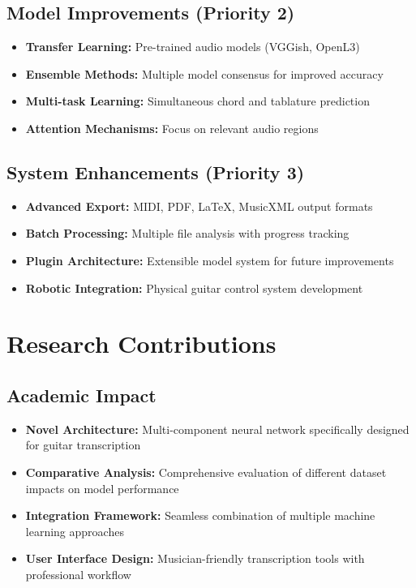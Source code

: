 \documentclass[11pt]{article}
\begin{document}
\subsection*{Model Improvements (Priority 2)}
\begin{itemize}[leftmargin=*,itemsep=2pt]
  \item \textbf{Transfer Learning:} Pre-trained audio models (VGGish, OpenL3)
  \item \textbf{Ensemble Methods:} Multiple model consensus for improved accuracy
  \item \textbf{Multi-task Learning:} Simultaneous chord and tablature prediction
  \item \textbf{Attention Mechanisms:} Focus on relevant audio regions
\end{itemize}

\subsection*{System Enhancements (Priority 3)}
\begin{itemize}[leftmargin=*,itemsep=2pt]
  \item \textbf{Advanced Export:} MIDI, PDF, LaTeX, MusicXML output formats
  \item \textbf{Batch Processing:} Multiple file analysis with progress tracking
  \item \textbf{Plugin Architecture:} Extensible model system for future improvements
  \item \textbf{Robotic Integration:} Physical guitar control system development
\end{itemize}

\section*{Research Contributions}

\subsection*{Academic Impact}
\begin{itemize}[leftmargin=*,itemsep=2pt]
  \item \textbf{Novel Architecture:} Multi-component neural network specifically designed for guitar transcription
  \item \textbf{Comparative Analysis:} Comprehensive evaluation of different dataset impacts on model performance
  \item \textbf{Integration Framework:} Seamless combination of multiple machine learning approaches
  \item \textbf{User Interface Design:} Musician-friendly transcription tools with professional workflow
\end{itemize}
\end{document}
